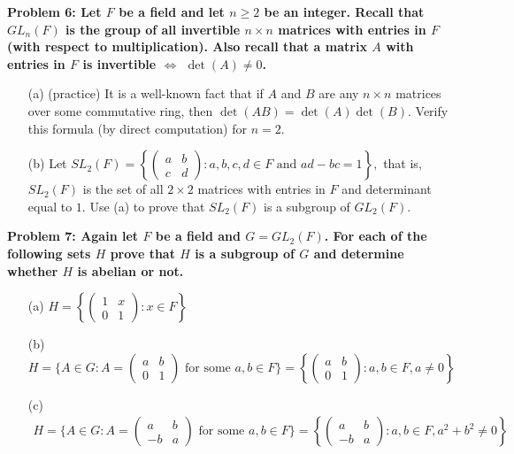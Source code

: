 \documentclass[11pt]{amsart}
\begin{document}
\bf{Problem 6: }\rm Let $F$ be a field and let $n\geq 2$ be an integer. Recall that $GL_n(F)$ is the group of all {\bf invertible } 
$n\times n$ matrices with entries in $F$ (with respect to multiplication).
Also recall that a matrix $A$ with entries in $F$ is invertible $\iff$ $\det(A)\neq 0$.
\begin{itemize}
\item[(a)] (practice) It is a well-known fact that if $A$ and $B$ are any $n\times n$ matrices over some commutative
ring, then $\det(AB)=\det(A)\det(B)$. Verify this formula (by direct computation) for $n=2$.
\item[(b)] Let $SL_2(F)=\left\{\begin{pmatrix}a&b\\ c&d
\end{pmatrix}: a,b,c,d\in F \mbox{ and }ad-bc=1\right\},$ that is, $SL_2(F)$ is the set of all
$2\times 2$ matrices with entries in $F$ and determinant equal to $1$. Use (a) to prove that
$SL_2(F)$ is a subgroup of $GL_2(F)$.
\end{itemize}

\bf{Problem 7: }\rm Again let $F$ be a field and $G=GL_2(F)$. For each of the following sets $H$ prove that
$H$ is a subgroup of $G$ and determine whether $H$ is abelian or not.
\begin{itemize}
\item[(a)] $H=\left\{ \begin{pmatrix}1 & x\\ 0 & 1\end{pmatrix} : x\in F\right\}$
\item[(b)] $H=\{A\in G: A=\begin{pmatrix}a & b\\ 0 & 1\end{pmatrix} \mbox { for some }a,b\in F\}=
\left\{ \begin{pmatrix}a & b\\ 0 & 1\end{pmatrix} : a,b\in F, a\neq 0\right\}$
\item[(c)] \begin{multline*}H=\{A\in G: A=\begin{pmatrix}a & b\\ -b & a\end{pmatrix} \mbox { for some }a,b\in F\}=
\left\{ \begin{pmatrix}a & b\\ -b & a\end{pmatrix} : a,b\in F, a^2+b^2\neq 0\right\}
\end{multline*}
\end{itemize}
\skv
 
\end{document}
